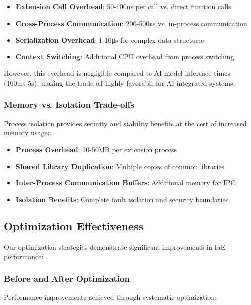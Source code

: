 \begin{itemize}
    \item \textbf{Extension Call Overhead}: 50-100ns per call vs. direct function calls
    \item \textbf{Cross-Process Communication}: 200-500ns vs. in-process communication
    \item \textbf{Serialization Overhead}: 1-10μs for complex data structures
    \item \textbf{Context Switching}: Additional CPU overhead from process switching
\end{itemize}

However, this overhead is negligible compared to AI model inference times (100ms-5s), making the trade-off highly favorable for AI-integrated systems.

\subsubsection{Memory vs. Isolation Trade-offs}

Process isolation provides security and stability benefits at the cost of increased memory usage:

\begin{itemize}
    \item \textbf{Process Overhead}: 10-50MB per extension process
    \item \textbf{Shared Library Duplication}: Multiple copies of common libraries
    \item \textbf{Inter-Process Communication Buffers}: Additional memory for IPC
    \item \textbf{Isolation Benefits}: Complete fault isolation and security boundaries
\end{itemize}

\subsection{Optimization Effectiveness}

Our optimization strategies demonstrate significant improvements in IaE performance:

\subsubsection{Before and After Optimization}

Performance improvements achieved through systematic optimization:

